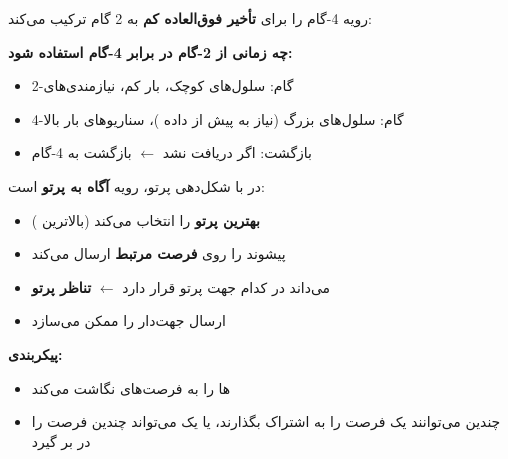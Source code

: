 


\CNchained{}

\CNchained{}

رویه 4-گام را برای \textbf{تأخیر فوق‌العاده کم} به 2 گام ترکیب می‌کند:


\textbf{چه زمانی از 2-گام در برابر 4-گام استفاده شود:}

\begin{itemize}
\tightlist
\item
  2-گام: سلول‌های کوچک، بار کم، نیازمندی‌های 
\item
  4-گام: سلول‌های بزرگ (نیاز به  پیش از داده )، سناریوهای بار بالا
\item
  بازگشت: اگر  دریافت نشد \ensuremath{\leftarrow} بازگشت به 4-گام
\end{itemize}



در  با شکل‌دهی پرتو، رویه  \textbf{آگاه به پرتو} است:


\begin{itemize}
\tightlist
\item
   \textbf{بهترین پرتو } را انتخاب می‌کند (بالاترین )
\item
  پیشوند را روی \textbf{فرصت  مرتبط} ارسال می‌کند
\item
   می‌داند  در کدام جهت پرتو قرار دارد \ensuremath{\leftarrow} \textbf{تناظر پرتو}
\item
  ارسال  جهت‌دار را ممکن می‌سازد
\end{itemize}

\textbf{پیکربندی:}

\begin{itemize}
\tightlist
\item
  ها را به فرصت‌های  نگاشت می‌کند
\item
  چندین  می‌توانند یک فرصت  را به اشتراک بگذارند، یا یک  می‌تواند چندین فرصت را در بر گیرد
\end{itemize}

